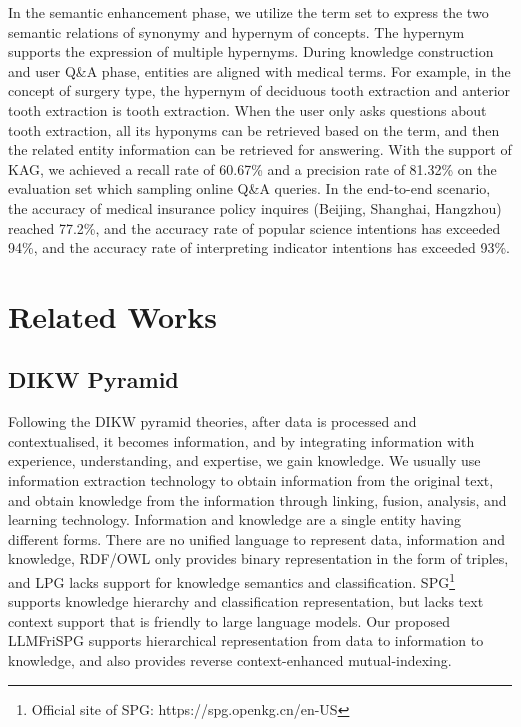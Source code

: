 \documentclass{article}
\begin{document}
In the semantic enhancement phase, we utilize the term set to express the two semantic relations of synonymy and hypernym of concepts. The hypernym supports the expression of multiple hypernyms. During knowledge construction and user Q\&A phase, entities are aligned with medical terms. For example, in the concept of surgery type, the hypernym of deciduous tooth extraction and anterior tooth extraction is tooth extraction. When the user only asks questions about tooth extraction, all its hyponyms can be retrieved based on the term, and then the related entity information can be retrieved for answering.
With the support of KAG, we achieved a recall rate of 60.67\% and a precision rate of 81.32\% on the evaluation set which sampling online Q\&A queries. In the end-to-end scenario, the accuracy of medical insurance policy inquires (Beijing, Shanghai, Hangzhou) reached 77.2\%, and the accuracy rate of popular science intentions has exceeded 94\%, and the accuracy rate of interpreting indicator intentions has exceeded 93\%.
\section{Related Works}

\subsection{DIKW Pyramid}
Following the DIKW pyramid theories\cite{ackoff1989data, baskarada2013data, terra2003understanding, hey2004data}, after data is processed and contextualised, it becomes information, and by integrating information with experience, understanding, and expertise, we gain knowledge. We usually use information extraction technology to obtain information from the original text\cite{sarawagi2008information,weikum2010information,piskorski2013information}, and obtain knowledge from the information through linking, fusion, analysis, and learning technology\cite{terra2003understanding, sajja2010knowledge, weikum2010information}. Information and knowledge are a single entity having different forms. There are no unified language to represent data, information and knowledge, RDF/OWL\cite{allemang2011semantic} only provides binary representation in the form of triples, and LPG\cite{sharma2019schema} lacks support for knowledge semantics and classification. SPG\footnote{Official site of SPG: https://spg.openkg.cn/en-US}\cite{yikgfabric} supports knowledge hierarchy and classification representation, but lacks text context support that is friendly to large language models. Our proposed LLMFriSPG supports hierarchical representation from data to information to knowledge, and also provides reverse context-enhanced mutual-indexing. 
\end{document}
